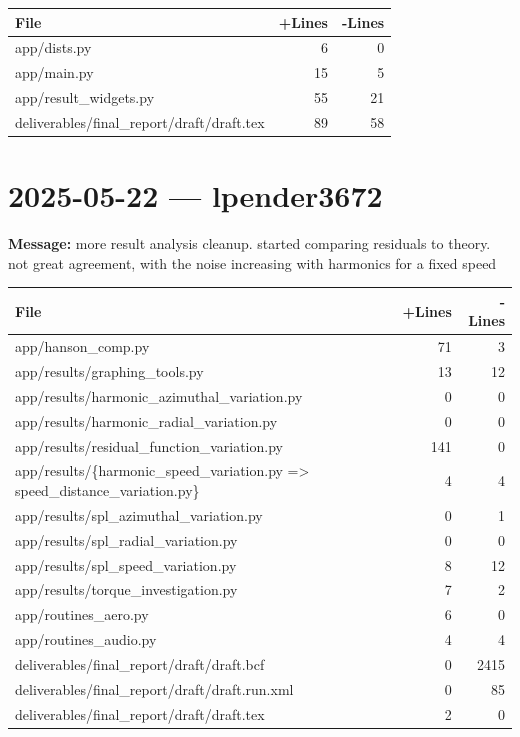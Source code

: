 \documentclass{article}
\begin{document}
\begin{longtable}{|p{10cm}|r|r|}
\hline \textbf{File} & \textbf{+Lines} & \textbf{-Lines} \\
\hline
app/dists.py & 6 & 0 \\
\hline
app/main.py & 15 & 5 \\
\hline
app/result\_widgets.py & 55 & 21 \\
\hline
deliverables/final\_report/draft/draft.tex & 89 & 58 \\
\hline
\end{longtable}

\section*{2025-05-22 --- lpender3672}
\textbf{Message:} more result analysis cleanup. started comparing residuals to theory. not great agreement, with the noise increasing with harmonics for a fixed speed

\begin{longtable}{|p{10cm}|r|r|}
\hline \textbf{File} & \textbf{+Lines} & \textbf{-Lines} \\
\hline
app/hanson\_comp.py & 71 & 3 \\
\hline
app/results/graphing\_tools.py & 13 & 12 \\
\hline
app/results/harmonic\_azimuthal\_variation.py & 0 & 0 \\
\hline
app/results/harmonic\_radial\_variation.py & 0 & 0 \\
\hline
app/results/residual\_function\_variation.py & 141 & 0 \\
\hline
app/results/\{harmonic\_speed\_variation.py => speed\_distance\_variation.py\} & 4 & 4 \\
\hline
app/results/spl\_azimuthal\_variation.py & 0 & 1 \\
\hline
app/results/spl\_radial\_variation.py & 0 & 0 \\
\hline
app/results/spl\_speed\_variation.py & 8 & 12 \\
\hline
app/results/torque\_investigation.py & 7 & 2 \\
\hline
app/routines\_aero.py & 6 & 0 \\
\hline
app/routines\_audio.py & 4 & 4 \\
\hline
deliverables/final\_report/draft/draft.bcf & 0 & 2415 \\
\hline
deliverables/final\_report/draft/draft.run.xml & 0 & 85 \\
\hline
deliverables/final\_report/draft/draft.tex & 2 & 0 \\
\hline
\end{longtable}
\end{document}
